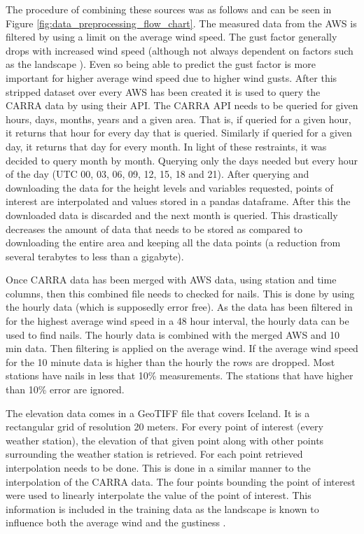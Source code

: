 The procedure of combining these sources was as follows and can be seen in Figure \ref{fig:data_preprocessing_flow_chart}. The measured data from the AWS is filtered by using a limit on the average wind speed. The gust factor generally drops with increased wind speed (although not always dependent on factors such as the landscape \cite{GNP_vidtal}). Even so being able to predict the gust factor is more important for higher average wind speed due to higher wind gusts. After this stripped dataset over every AWS has been created it is used to query the CARRA data by using their API. The CARRA API needs to be queried for given hours, days, months, years and a given area. That is, if queried for a given hour, it returns that hour for every day that is queried. Similarly if queried for a given day, it returns that day for every month. In light of these restraints, it was decided to query month by month. Querying only the days needed but every hour of the day (UTC 00, 03, 06, 09, 12, 15, 18 and 21). After querying and downloading the data for the height levels and variables requested, points of interest are interpolated and values stored in a pandas dataframe. After this the downloaded data is discarded and the next month is queried. This drastically decreases the amount of data that needs to be stored as compared to downloading the entire area and keeping all the data points (a reduction from several terabytes to less than a gigabyte).

Once CARRA data has been merged with AWS data, using station and time columns, then this combined file needs to checked for nails. This is done by using the hourly data (which is supposedly error free). As the data has been filtered in for the highest average wind speed in a 48 hour interval, the hourly data can be used to find nails. The hourly data is combined with the merged AWS and 10 min data. Then filtering is applied on the average wind. If the average wind speed for the 10 minute data is higher than the hourly the rows are dropped. Most stations have nails in less that 10\% measurements. The stations that have higher than 10\% error are ignored.

The elevation data comes in a GeoTIFF file that covers Iceland. It is a rectangular grid of resolution 20 meters. For every point of interest (every weather station), the elevation of that given point along with other points surrounding the weather station is retrieved. For each point retrieved interpolation needs to be done. This is done in a similar manner to the interpolation of the CARRA data. The four points bounding the point of interest were used to linearly interpolate the value of the point of interest. This information is included in the training data as the landscape is known to influence both the average wind and the gustiness \cite{GNP_vidtal}.

